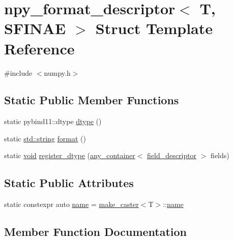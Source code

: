 \hypertarget{structnpy__format__descriptor}{}\section{npy\+\_\+format\+\_\+descriptor$<$ T, S\+F\+I\+N\+AE $>$ Struct Template Reference}
\label{structnpy__format__descriptor}


{\ttfamily \#include $<$numpy.\+h$>$}

\subsection*{Static Public Member Functions}
\begin{DoxyCompactItemize}
\item 
static pybind11\+::dtype \mbox{\hyperlink{structnpy__format__descriptor_a6f4a2b3a1f4e0a874272f9e2ddc1d769}{dtype}} ()
\item 
static \mbox{\hyperlink{_s_d_l__opengl__glext_8h_ab4ccfaa8ab0e1afaae94dc96ef52dde1}{std\+::string}} \mbox{\hyperlink{structnpy__format__descriptor_adb679e564c19db5f7b434b12f92b2488}{format}} ()
\item 
static \mbox{\hyperlink{_s_d_l__opengles2__gl2ext_8h_ae5d8fa23ad07c48bb609509eae494c95}{void}} \mbox{\hyperlink{structnpy__format__descriptor_afc2225aad13f5b6ccdc2267a824d7d77}{register\+\_\+dtype}} (\mbox{\hyperlink{classany__container}{any\+\_\+container}}$<$ \mbox{\hyperlink{structfield__descriptor}{field\+\_\+descriptor}} $>$ fields)
\end{DoxyCompactItemize}
\subsection*{Static Public Attributes}
\begin{DoxyCompactItemize}
\item 
static constexpr auto \mbox{\hyperlink{structnpy__format__descriptor_af6c52fd43c97ce1c90ddc72f91a746fb}{name}} = \mbox{\hyperlink{cast_8h_ab32b52411a6b07420516d79074815713}{make\+\_\+caster}}$<$T$>$\+::\mbox{\hyperlink{structname}{name}}
\end{DoxyCompactItemize}


\subsection{Member Function Documentation}
\mbox{\label{structnpy__format__descriptor_a6f4a2b3a1f4e0a874272f9e2ddc1d769}} 
